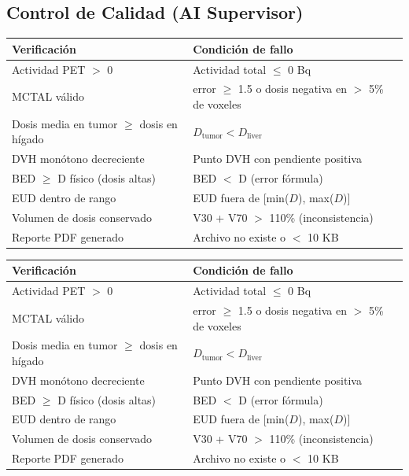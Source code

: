 \documentclass[12pt,a4paper]{article}
\begin{document}
\begin{tcolorbox}[aiSupervisor]
\subsection*{Control de Calidad (AI Supervisor)}

\begin{tabular}{p{5cm} p{10cm}}
\toprule
\textbf{Verificación} & \textbf{Condición de fallo} \\
\midrule
Actividad PET $>$ 0 & Actividad total $\leq$ 0 Bq \\
MCTAL válido & error $\geq$ 1.5 o dosis negativa en $>$ 5\% de voxeles \\
Dosis media en tumor $\geq$ dosis en hígado & $D_{\text{tumor}} < D_{\text{liver}}$ \\
DVH monótono decreciente & Punto DVH con pendiente positiva \\
BED $\geq$ D físico (dosis altas) & BED $<$ D (error fórmula) \\
EUD dentro de rango & EUD fuera de [min($D$), max($D$)] \\
Volumen de dosis conservado & V30 + V70 $>$ 110\% (inconsistencia) \\
Reporte PDF generado & Archivo no existe o $<$ 10 KB \\
\bottomrule
\end{tabular}

\newpage




\begin{tabular}{p{5cm} p{10cm}}
\toprule
\textbf{Verificación} & \textbf{Condición de fallo} \\
\midrule
Actividad PET $>$ 0 & Actividad total $\leq$ 0 Bq \\
MCTAL válido & error $\geq$ 1.5 o dosis negativa en $>$ 5\% de voxeles \\
Dosis media en tumor $\geq$ dosis en hígado & $D_{\text{tumor}} < D_{\text{liver}}$ \\
DVH monótono decreciente & Punto DVH con pendiente positiva \\
BED $\geq$ D físico (dosis altas) & BED $<$ D (error fórmula) \\
EUD dentro de rango & EUD fuera de [min($D$), max($D$)] \\
Volumen de dosis conservado & V30 + V70 $>$ 110\% (inconsistencia) \\
Reporte PDF generado & Archivo no existe o $<$ 10 KB \\
\bottomrule
\end{tabular}

\newpage

\end{tcolorbox}
\end{document}
